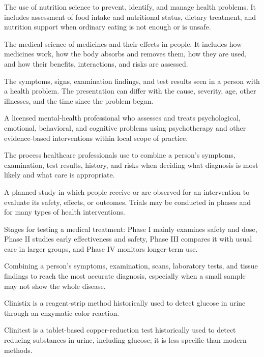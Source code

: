  The use of nutrition science to prevent, identify, and manage health problems. It includes assessment of food intake and nutritional status, dietary treatment, and nutrition support when ordinary eating is not enough or is unsafe.

 The medical science of medicines and their effects in people. It includes how medicines work, how the body absorbs and removes them, how they are used, and how their benefits, interactions, and risks are assessed.

 The symptoms, signs, examination findings, and test results seen in a person with a health problem. The presentation can differ with the cause, severity, age, other illnesses, and the time since the problem began.

 A licensed mental-health professional who assesses and treats psychological, emotional, behavioral, and cognitive problems using psychotherapy and other evidence-based interventions within local scope of practice.

 The process healthcare professionals use to combine a person's symptoms, examination, test results, history, and risks when deciding what diagnosis is most likely and what care is appropriate.

 A planned study in which people receive or are observed for an intervention to evaluate its safety, effects, or outcomes. Trials may
be conducted in phases and for many types of health interventions.

 Stages for testing a medical treatment: Phase I mainly examines safety and dose, Phase II studies early effectiveness and safety, Phase III compares it with usual care in larger groups, and Phase IV monitors longer-term use.

 Combining a person's symptoms, examination, scans, laboratory tests, and tissue findings to reach the most accurate diagnosis, especially when a small sample may not show the whole disease.

 Clinistix is a reagent-strip method historically used to detect glucose in urine through an enzymatic color reaction.

 Clinitest is a tablet-based copper-reduction test historically used to detect reducing substances in urine, including glucose; it is less specific than modern methods.

